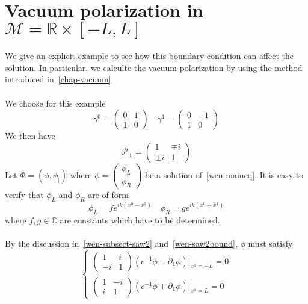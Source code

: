 \section{Vacuum polarization in $\mathcal{M} = \mathbb R \times [-L, L]$ }
We give an explicit example to see how this boundary condition can affect the solution. 
In particular, we calculte the vacuum polarization by using the method introduced in~\cref{chap-vacuum}\\\\
We choose for this example
\begin{equation*}
\gamma^0 = \begin{pmatrix} 0 & 1 \\ 1 & 0 \end{pmatrix} \quad
\gamma^1 = \begin{pmatrix} 0 & -1 \\ 1 & 0 \end{pmatrix}
\end{equation*}
We then have 
\begin{equation*}
\mathcal{P}_\pm = \begin{pmatrix} 1 & \mp i \\ \pm i & 1 \end{pmatrix}
\end{equation*}
Let $\Phi = (\phi, \phi_|)$ where $\phi = \begin{pmatrix} \phi_L \\ \phi_R \end{pmatrix}$ be a solution of~\cref{wen-maineq}. 
It is easy to verify that $\phi_L$ and $\phi_R$ are of form
\begin{equation*}
\phi_L = f e^{ik(x^0 - x^1)} \quad
\phi_R = g e^{ik(x^0 + x^1)}
\end{equation*}
where $f, g\in\mathbb C$ are constants which have to be determined. \\\\
By the discussion in~\cref{wen-subsect-saw2} and~\cref{wen-saw2bound}, $\phi$ must satisfy
\begin{equation*}
\begin{cases}
\begin{pmatrix} 1 & i \\ -i & 1 \end{pmatrix}(c^{-1} \phi - \partial_1 \phi)\vert_{x^1 = -L} = 0 \\
%
\begin{pmatrix} 1 & -i \\ i & 1 \end{pmatrix}(c^{-1} \phi + \partial_1 \phi)\vert_{x^1 = L} = 0
\end{cases}
\end{equation*}
